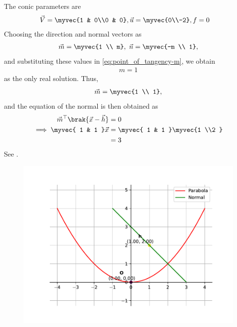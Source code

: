 The conic parameters are
\begin{align}
	\vec{V} = \myvec{1 & 0\\0 & 0},
	\vec{u} = \myvec{0\\-2},
	f &= 0
\end{align}
Choosing the direction and normal vectors as
\begin{align}
	\vec{m} = \myvec{1 \\ m}, \
	\vec{n} = \myvec{-m \\ 1}, 
\end{align}
and substituting these values in
	\eqref{eq:point_of_tangency-m},
 we obtain
\begin{align}
m = 1
\end{align}
as the only real solution.  Thus, 
\begin{align}
	\vec{m} = \myvec{1 \\ 1}, 
\end{align}
and 
	the equation of the normal is then obtained as
\begin{align}
	\vec{m}^{\top}\brak{\vec{x}-\vec{h}} &= 0
	\\
	\implies
\myvec{
1 & 1
}
		\vec{x}
	&=
\myvec{
1 & 1
}
	\myvec{1 \\2 }
	\\
	&= 3
\end{align}
		See .
	\begin{figure}[H]
		\centering
 \includegraphics[width=0.75\columnwidth]{chapters/12/6/6/4/figs/fig.pdf}
		\caption{}
		\label{fig:12/6/6/4}
  	\end{figure}
